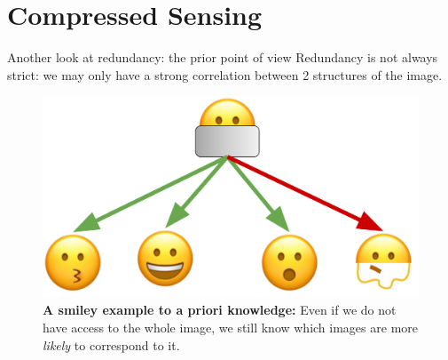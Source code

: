 \documentclass[aspectratio=169,xcolor=dvipsnames]{beamer}
\begin{document}
\section{Compressed Sensing}
\begin{frame}{Another look at redundancy: the prior point of view}
    Redundancy is not always strict: we may only have a strong correlation between 2 structures of the image.
    \begin{figure}
        \centering
        \includegraphics[height=0.5\textheight]{Figures/cs_figures/smiley_prior.pdf}
        \caption{\label{fig:redundancy-smiley}\textbf{A smiley example to a priori knowledge:} Even if we do not have access to the whole image, we still know which images are more \emph{likely} to correspond to it.
        }
    \end{figure}
\end{frame}
\end{document}
